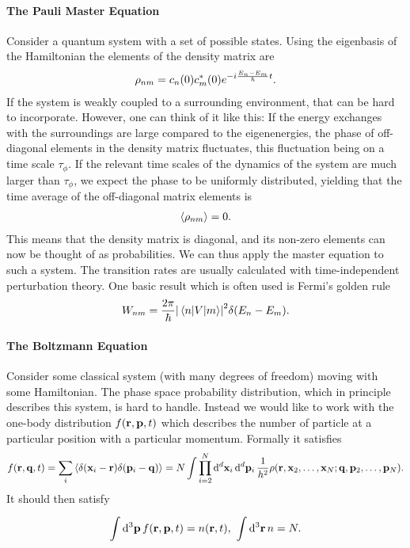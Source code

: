 \paragraph{The Pauli Master Equation}
Consider a quantum system with a set of possible states. Using the eigenbasis of the Hamiltonian the elements of the density matrix are
\begin{align*}
	\rho_{nm} = c_{n}(0)c^{*}_{m}(0)e^{-i\frac{E_{n} - E_{m}}{\hbar}t}.
\end{align*}
If the system is weakly coupled to a surrounding environment, that can be hard to incorporate. However, one can think of it like this: If the energy exchanges with the surroundings are large compared to the eigenenergies, the phase of off-diagonal elements in the density matrix fluctuates, this fluctuation being on a time scale $\tau_{\phi}$. If the relevant time scales of the dynamics of the system are much larger than $\tau_{\phi}$, we expect the phase to be uniformly distributed, yielding that the time average of the off-diagonal matrix elements is
\begin{align*}
	\expval{\rho_{nm}} = 0.
\end{align*}
This means that the density matrix is diagonal, and its non-zero elements can now be thought of as probabilities. We can thus apply the master equation to such a system. The transition rates are usually calculated with time-independent perturbation theory. One basic result which is often used is Fermi's golden rule
\begin{align*}
	W_{nm} = \frac{2\pi}{\hbar}\abs{\mel{n}{V}{m}}^{2}\delta(E_{n} - E_{m}).
\end{align*}

\paragraph{The Boltzmann Equation}
Consider some classical system (with many degrees of freedom) moving with some Hamiltonian. The phase space probability distribution, which in principle describes this system, is hard to handle. Instead we would like to work with the one-body distribution $f(\vb{r}, \vb{p}, t)$ which describes the number of particle at a particular position with a particular momentum. Formally it satisfies
\begin{align*}
	f(\vb{r}, \vb{q}, t) = \sum\limits_{i}\expval{\delta(\vb{x}_{i} - \vb{r})\delta(\vb{p}_{i} - \vb{q})} = N\int\prod\limits_{i = 2}^{N}\dd[d]{\vb{x}_{i}}\dd[d]{\vb{p}_{i}}\frac{1}{h^{2}}\rho(\vb{r}, \vb{x}_{2}, \dots, \vb{x}_{N}; \vb{q}, \vb{p}_{2}, \dots, \vb{p}_{N}).
\end{align*}
It should then satisfy
\begin{align*}
	\integ[3]{}{}{\vb{p}}{f(\vb{r}, \vb{p}, t)} = n(\vb{r}, t),\ \integ[3]{}{}{\vb{r}}{n} = N.
\end{align*}

